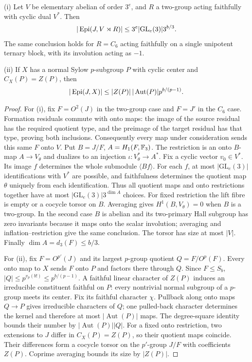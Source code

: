 \begin{lemma}\label{lem:cyclic-dual-onto}
(i) Let $V$ be elementary abelian of order $3^e$, and $R$ a
two-group acting faithfully with cyclic dual $V^*$. Then
\[
 |\operatorname{Epi}(J,V\rtimes R)|\leq3^e|\mathrm{GL}_e(3)|3^{b/3}.
\]
The same conclusion holds for $R=C_6$ acting faithfully on a single
unipotent ternary block, with its involution acting as $-1$.

(ii) If $X$ has a normal Sylow $p$-subgroup $P$ with cyclic center
and $C_X(P)=Z(P)$, then
\[
 |\operatorname{Epi}(J,X)|\leq |Z(P)|\,|\operatorname{Aut}(P)|p^{b/(p-1)}.
\]
\end{lemma}
\begin{proof}
For (i), fix $F=O^2(J)$ in the two-group case and $F=J'$ in the
$C_6$ case. Formation residuals commute with onto maps: the image
of the source residual has the required quotient type, and the
preimage of the target residual has that type, proving both
inclusions. Consequently every map under consideration sends this
same $F$ onto $V$. Put $B=J/F$, $A=H_1(F,\mathbb F_3)$.
The restriction is an onto $B$-map $A\to V_\theta$ and dualizes
to an injection $\iota:V_\theta^*\to A^*$. Fix a cyclic vector
$v_0\in V^*$. Its image $f$ determines the whole submodule
$\langle Bf\rangle$. For each $f$, at most
$|\mathrm{GL}_e(3)|$ identifications with $V^*$ are possible, and
faithfulness determines the quotient map $\theta$ uniquely from
each identification. Thus all quotient maps and onto restrictions
together have at most $|\mathrm{GL}_e(3)|3^{\dim A}$ choices.
For fixed restriction the lift fibre is empty or a cocycle torsor
on $B$. Averaging gives $H^1(B,V_\theta)=0$ when $B$ is a
two-group. In the second case $B$ is abelian and its two-primary
Hall subgroup has zero invariants because it maps onto the scalar
involution; averaging and inflation--restriction give the same
conclusion. The torsor has size at most $|V|$. Finally
$\dim A=d_3(F)\leq b/3$.

For (ii), fix $F=O^{p'}(J)$ and its largest $p$-group quotient
$Q=F/O^p(F)$. Every onto map to $X$ sends $F$ onto $P$ and factors
there through $Q$. Since $F\leq S_b$,
$|Q|\leq p^{v_p(b!)}\leq p^{b/(p-1)}$.
A faithful linear character of $Z(P)$ induces an irreducible
constituent faithful on $P$: every nontrivial normal subgroup of a
$p$-group meets its center. Fix its faithful character $\chi$.
Pullback along onto maps $Q\to P$ gives irreducible characters of
$Q$; one pulled-back character determines the kernel and therefore
at most $|\operatorname{Aut}(P)|$ maps. The degree-square identity
bounds their number by $|\operatorname{Aut}(P)||Q|$.
For a fixed onto restriction, two extensions to $J$ differ in
$C_X(P)=Z(P)$, so their quotient maps coincide. Their differences
form a cocycle torsor on the $p'$-group $J/F$ with coefficients
$Z(P)$. Coprime averaging bounds its size by $|Z(P)|$.
\end{proof}

